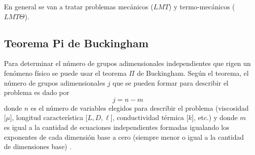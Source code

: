 En general se van a tratar problemas mecánicos ($LMT$) y termo-mecánicos ($LMT\Theta$).

\subsection{Teorema Pi de Buckingham}
 
 Para determinar el número de grupos adimensionales independientes que rigen un fenómeno físico se puede usar el teorema $\Pi$ de Buckingham. Según el teorema, el número de grupos adimensionales $j$ que se pueden formar para describir el problema es dado por
 \[
 j=n-m
 \]
 donde $n$ es el número de variables elegidos para describir el problema (viscosidad [$\mu$], longitud característica [$L,D,\ell$], conductividad térmica [$k$], etc.) y donde $m$ es igual a la cantidad de ecuaciones independientes formadas igualando los exponentes de cada dimensión base a cero (siempre menor o igual a la cantidad de dimensiones base) \citep{kreith2011principles}. 
 
 
 
 